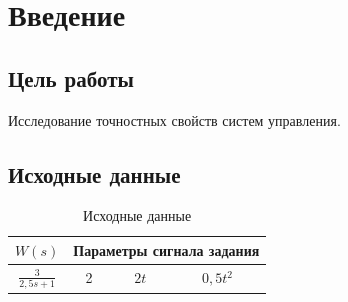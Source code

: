 \documentclass[a4paper, 11pt, russian]{article}
\begin{document}
    

    \section{Введение}
    \subsection{Цель работы}
    Исследование точностных свойств систем управления.
    \subsection{Исходные данные}
    \begin{table}[ht!]
        \flushleft
        \caption{Исходные данные}
        \begin{tabular}{c|c|c|c}
            $W(s)$ & \multicolumn{3}{c}{Параметры сигнала задания} \\
            \hline
            $\displaystyle{\frac{3}{2,5s + 1}}$ & 2 & $2t$ & $0,5t^2$
        \end{tabular}
    \end{table}
    \clearpage
\end{document}
